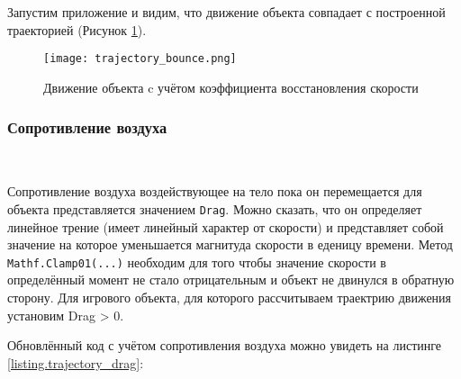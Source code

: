 Запустим приложение и видим, что движение объекта совпадает с построенной траекторией (Рисунок \ref{picture.trajectory_bounce}).

\begin{figure}[h]
	\noindent\centering
	\texttt{[image: trajectory\_bounce.png]}  
	\caption{Движение объекта c учётом коэффициента восстановления скорости}
	\label{picture.trajectory_bounce}
\end{figure}

\subsubsection{Сопротивление воздуха}~

Сопротивление воздуха воздействующее на тело пока он перемещается для объекта представляется значением \lstinline|Drag|. Можно сказать, что он определяет линейное трение (имеет линейный характер от скорости) и представляет собой значение на которое уменьшается магнитуда скорости в еденицу времени. Метод \lstinline|Mathf.Clamp01(...)| необходим для того чтобы значение скорости в определённый момент не стало отрицательным и объект не двинулся в обратную сторону. Для игрового объекта, для которого рассчитываем траектрию движения установим Drag > 0.

Обновлённый код с учётом сопротивления воздуха можно увидеть на листинге \ref{listing.trajectory_drag}:

